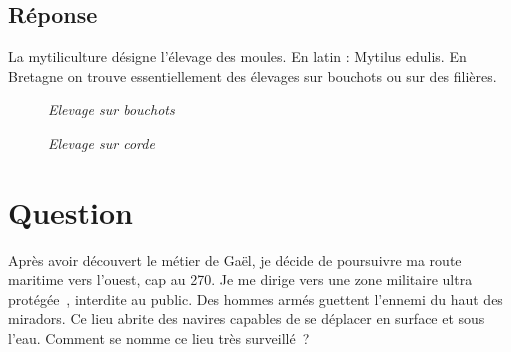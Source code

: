 \documentclass[12pt, report]{article}
\begin{document}
\subsection*{Réponse}
La mytiliculture désigne l'élevage des moules. En latin : Mytilus edulis. En Bretagne on trouve essentiellement des élevages  sur bouchots ou sur des filières.
\begin{center}
\begin{figure}[ht]
\caption{\textit{Elevage sur bouchots}}
\end{figure}
\end{center}
\begin{center}
\begin{figure}[ht]
\caption{\textit{Elevage sur corde}}
\end{figure}
\end{center}

\section{Question}
Après avoir découvert le métier de Gaël, je décide de poursuivre ma route maritime vers l'ouest, cap au 270.  Je me dirige vers une zone militaire ultra protégée , interdite au public.  Des hommes armés guettent l’ennemi du haut des miradors. Ce lieu abrite des navires capables de se déplacer en surface et sous l’eau. Comment se nomme ce lieu très surveillé ? 
\end{document}
